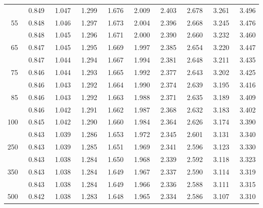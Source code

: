 \begin{center}
\begin{tabular}{r | rrr rr rrrr}
\gray   50	&	~0.849	&	~1.047	&	~1.299	&	~1.676	&	~2.009	&	~2.403	&	~2.678	&	~3.261	&	~3.496	\\
        55	&	~0.848	&	~1.046	&	~1.297	&	~1.673	&	~2.004	&	~2.396	&	~2.668	&	~3.245	&	~3.476	\\
\gray   60	&	~0.848	&	~1.045	&	~1.296	&	~1.671	&	~2.000	&	~2.390	&	~2.660	&	~3.232	&	~3.460	\\
        65	&	~0.847	&	~1.045	&	~1.295	&	~1.669	&	~1.997	&	~2.385	&	~2.654	&	~3.220	&	~3.447	\\
\hline
\gray   70	&	~0.847	&	~1.044	&	~1.294	&	~1.667	&	~1.994	&	~2.381	&	~2.648	&	~3.211	&	~3.435	\\
        75	&	~0.846	&	~1.044	&	~1.293	&	~1.665	&	~1.992	&	~2.377	&	~2.643	&	~3.202	&	~3.425	\\
\gray   80	&	~0.846	&	~1.043	&	~1.292	&	~1.664	&	~1.990	&	~2.374	&	~2.639	&	~3.195	&	~3.416	\\
        85	&	~0.846	&	~1.043	&	~1.292	&	~1.663	&	~1.988	&	~2.371	&	~2.635	&	~3.189	&	~3.409	\\
\gray	90	&	~0.846	&	~1.042	&	~1.291	&	~1.662	&	~1.987	&	~2.368	&	~2.632	&	~3.183	&	~3.402	\\
\hline
\hline
100	&	~0.845	&	~1.042	&	~1.290	&	~1.660	&	~1.984	&	~2.364	&	~2.626	&	~3.174	&	~3.390	\\
\gray		200	&	~0.843	&	~1.039	&	~1.286	&	~1.653	&	~1.972	&	~2.345	&	~2.601	&	~3.131	&	~3.340	\\
250	&	~0.843	&	~1.039	&	~1.285	&	~1.651	&	~1.969	&	~2.341	&	~2.596	&	~3.123	&	~3.330	\\
\gray   300	&	~0.843	&	~1.038	&	~1.284	&	~1.650	&	~1.968	&	~2.339	&	~2.592	&	~3.118	&	~3.323	\\
350	&	~0.843	&	~1.038	&	~1.284	&	~1.649	&	~1.967	&	~2.337	&	~2.590	&	~3.114	&	~3.319	\\
\hline
\gray	400	&	~0.843	&	~1.038	&	~1.284	&	~1.649	&	~1.966	&	~2.336	&	~2.588	&	~3.111	&	~3.315	\\
   500	&	~0.842	&	~1.038	&	~1.283	&	~1.648	&	~1.965	&	~2.334	&	~2.586	&	~3.107	&	~3.310	\\

\end{tabular}
\end{center}
